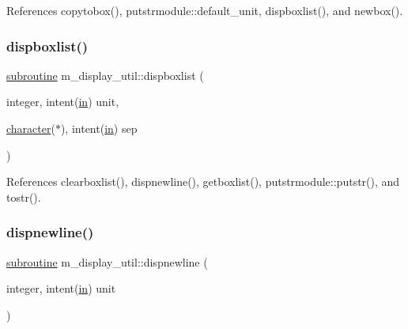 References copytobox(), putstrmodule\+::default\+\_\+unit, dispboxlist(), and newbox().

\mbox{\label{namespacem__display__util_af04928d07a7f716a0098c44bdd7ec3fd}} 
\subsubsection{\texorpdfstring{dispboxlist()}{dispboxlist()}}
{\footnotesize\ttfamily \hyperlink{M__stopwatch_83_8txt_acfbcff50169d691ff02d4a123ed70482}{subroutine} m\+\_\+display\+\_\+util\+::dispboxlist (\begin{DoxyParamCaption}\item[{integer, intent(\hyperlink{M__journal_83_8txt_afce72651d1eed785a2132bee863b2f38}{in})}]{unit,  }\item[{\hyperlink{option__stopwatch_83_8txt_abd4b21fbbd175834027b5224bfe97e66}{character}($\ast$), intent(\hyperlink{M__journal_83_8txt_afce72651d1eed785a2132bee863b2f38}{in})}]{sep }\end{DoxyParamCaption})\hspace{0.3cm}{\ttfamily [private]}}



References clearboxlist(), dispnewline(), getboxlist(), putstrmodule\+::putstr(), and tostr().

\mbox{\label{namespacem__display__util_a0bbd58b5406fa166a20d83f9737c7acd}} 
\subsubsection{\texorpdfstring{dispnewline()}{dispnewline()}}
{\footnotesize\ttfamily \hyperlink{M__stopwatch_83_8txt_acfbcff50169d691ff02d4a123ed70482}{subroutine} m\+\_\+display\+\_\+util\+::dispnewline (\begin{DoxyParamCaption}\item[{integer, intent(\hyperlink{M__journal_83_8txt_afce72651d1eed785a2132bee863b2f38}{in})}]{unit }\end{DoxyParamCaption})\hspace{0.3cm}{\ttfamily [private]}}



